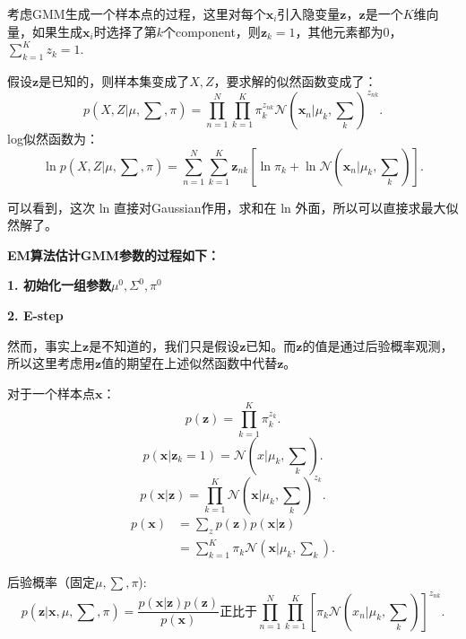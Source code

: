 \documentclass[UTF8]{ctexart}
\begin{document}
考虑GMM生成一个样本点的过程，这里对每个$\mathbf x_i$引入隐变量$\mathbf z$，$\mathbf z$是一个$K$维向量，如果生成$\mathbf x_i$时选择了第$k$个component，则$\mathbf z_k=1$，其他元素都为0，$\sum_{k=1}^{K}z_k=1$.

假设$\mathbf z$是已知的，则样本集变成了${X,Z}$，要求解的似然函数变成了：
\begin{equation}
  p(X,Z|\mu,\sum,\pi) = \prod_{n=1}^N\prod_{k=1}^K\pi_k^{z_{nk}}\mathcal N(\mathbf x_n|\mu_k,\sum_k)^{z_{nk}}.
\end{equation}
log似然函数为：
\begin{equation}\label{loglikelihood}
  \ln p(X,Z|\mu,\sum,\pi) = \sum_{n=1}^N\sum_{k=1}^K\mathbf z_{nk}[\ln\pi_k + \ln\mathcal N(\mathbf x_n|\mu_k,\sum_k)].
\end{equation}

可以看到，这次 ln 直接对Gaussian作用，求和在 ln 外面，所以可以直接求最大似然解了。

\textbf{EM算法估计GMM参数的过程如下：}

\textbf{1. 初始化一组参数$\mu ^0,\Sigma ^0,\pi ^0$}

\textbf{2. E-step}

然而，事实上$\mathbf z$是不知道的，我们只是假设$\mathbf z$已知。而$\mathbf z$的值是通过后验概率观测，所以这里考虑用$\mathbf z$值的期望在上述似然函数中代替$\mathbf z$。

对于一个样本点$\mathbf x$：
\begin{equation}
  p(\mathbf z) = \prod_{k=1}^K\pi_k^{z_k}.
\end{equation}
\begin{equation}
  p(\mathbf x|\mathbf z_k=1) = \mathcal N(x|\mu_k,\sum_k).
\end{equation}
\begin{equation}
  p(\mathbf x|\mathbf z) = \prod_{k=1}^K\mathcal N(\mathbf x|\mu_k,\sum_k)^{z_k}.
\end{equation}
\begin{equation}
  \begin{split}
    p(\mathbf x) &= \sum_zp(\mathbf z)p(\mathbf x|\mathbf z)\\
    &= \sum_{k=1}^K\pi_k\mathcal N(\mathbf x|\mu_k,\sum_k).
  \end{split}
\end{equation}

后验概率（固定$\mu,\sum,\pi$):
\begin{equation}
  p(\mathbf z|\mathbf x,\mu,\sum,\pi) = \frac{p(\mathbf x|\mathbf z)p(\mathbf z)}{p(\mathbf x)}\text{正比于}\prod_{n=1}^N\prod_{k=1}^K[{\pi_k\mathcal N(x_n|\mu_k,\sum_k)}]^{z_{nk}}.
\end{equation}
\end{document}
